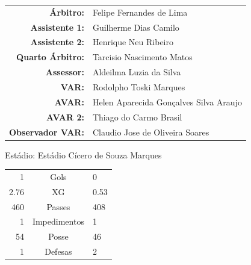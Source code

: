\documentclass[11pt]{article}
\begin{document}
\vspace{0.5cm}
\begin{minipage}{0.65\textwidth}
\begin{center}
\begin{tabular}{rl}
\textbf{Árbitro:} & Felipe Fernandes de Lima \\
\textbf{Assistente 1:} & Guilherme Dias Camilo \\
\textbf{Assistente 2:} & Henrique Neu Ribeiro \\
\textbf{Quarto Árbitro:} & Tarcisio Nascimento Matos \\
\textbf{Assessor:} & Aldeilma Luzia da Silva \\
\textbf{VAR:} & Rodolpho Toski Marques \\
\textbf{AVAR:} & Helen Aparecida Gonçalves Silva Araujo \\
\textbf{AVAR 2:} & Thiago do Carmo Brasil \\
\textbf{Observador VAR:} & Claudio Jose de Oliveira Soares \\
\end{tabular}
\end{center}
\end{minipage}
\begin{minipage}{0.3\textwidth}
Estádio: Estádio Cícero de Souza Marques\\
\begin{tabular}{rcl}
1 & Gols & 0 \\
2.76 & XG & 0.53 \\
460 & Passes & 408 \\
1 & Impedimentos & 1 \\
54 & Posse & 46 \\
1 & Defesas & 2 \\
\end{tabular}
\end{minipage}
\newpage
\end{document}
